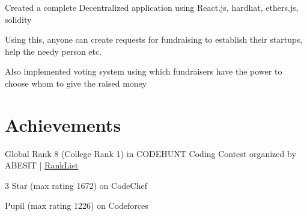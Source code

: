 \documentclass[letterpaper]{deedy-resume} %
\begin{document}
\begin{minipage}[t]{0.56\textwidth}

\begin{tightitemize}
\item Created a complete Decentralized application using React.js, hardhat, ethers.js, solidity
\item Using this, anyone can create requests for fundraising to establish their startups, help the needy person etc.
\item Also implemented voting system using which fundraisers have the power to choose whom to give the raised money 
\end{tightitemize}

\sectionspace

\section{Achievements}
\vspace{\topsep}
\begin{tightitemize}
\item Global Rank 8 (College Rank 1) in CODEHUNT Coding Contest organized by ABESIT | \href{https://www.codechef.com/rankings/CHNT2022?itemsPerPage=100&order=asc&page=1&sortBy=rank}{RankList}
\item 3 Star (max rating 1672) on CodeChef
\item Pupil (max rating 1226) on Codeforces
\end{tightitemize}






\end{minipage} %

\end{document}
